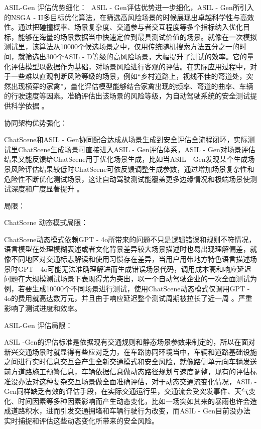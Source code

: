 ASIL-Gen 评估优势细化：
​
ASIL - Gen评估优势进一步细化，ASIL - Gen所引入的NSGA - II多目标优化算法，在筛选高风险场景的时候展现出卓越科学性与高效性。通过把碰撞概率、场景复杂度、交通参与者交互程度等多个指标纳入优化目标，能够在海量的场景数据当中快速定位到最具测试价值的场景。就像在一次模拟测试里，该算法从10000个候选场景之中，仅用传统随机搜索方法五分之一的时间，就筛选出300个ASIL - D等级的高风险场景\cite{段文强0基于用户行为序列的网络购买行为预测}，大幅提升了测试的效率。它的量化评估模型以数据作为基础，对场景风险进行客观的评估。在实际应用过程中，对于一些难以直观判断风险等级的场景，例如“乡村道路上，视线不佳的弯道处，突然出现横穿的家禽”，量化评估模型能够结合家禽出现的频率、弯道的曲率、车辆的行驶速度等因素。准确评估出该场景的风险等级，为自动驾驶系统的安全测试提供科学依据 。​


协同架构优势强化​：

ChatScene和ASIL - Gen协同配合达成从场景生成到安全评估全流程闭环，实际测试里ChatScene生成场景可直接进入ASIL - Gen评估体系，ASIL - Gen对场景评估结果又能反馈给ChatScene用于优化场景生成，比如当ASIL - Gen发现某个生成场景风险评估结果较低时ChatScene可依反馈调整生成参数，通过增加场景复杂性和危险性不断优化测试场景，这让自动驾驶测试能覆盖更多边缘情况和极端场景使测试深度和广度显著提升\cite{chen2016xgboost} 。


局限：

ChatScene 动态模式局限：

ChatScene动态模式依赖GPT - 4o所带来的问题不只是逻辑错误和规则不符情况，语言模型在处理模糊表述或者文化背景差异较大场景描述时也易出现理解偏差，就像不同地区对交通标志解读和使用习惯存在差异，当用户用带地方特色语言描述场景时GPT - 4o可能无法准确理解进而生成错误场景代码，调用成本高和响应延迟问题在大规模测试场景下表现得尤为突出，以一个自动驾驶企业的一次全面测试为例，若要生成10000个不同场景进行测试，使用ChatScene动态模式仅调用GPT - 4o的费用就高达数万元，并且由于响应延迟整个测试周期被拉长了近一周 。严重影响了测试进度和效率。​


ASIL-Gen 评估局限：

ASIL -Gen的评估标准是依据现有交通规则和静态场景参数来制定的，所以在面对新兴交通场景时就显得有些应对乏力，在车路协同环境当中，车辆和道路基础设施之间进行实时信息交互会产生全新交通模式和安全风险，就像路侧单元向车辆发送前方道路施工预警信息，车辆依据信息做动态路径规划与速度调整，现有的评估标准没办法对这种复杂交互场景做全面准确评估，对于动态交通流变化情况，ASIL - Gen同样缺乏有效的评估手段\cite{师圣蔓2019基于机器学习的网络流量预测与应用研究}，在实际交通运行里，交通流会受突发事件、天气变化、时间因素等多种因素影响而产生动态变化，比如一场突如其来的暴雨也许会造成道路积水，进而引发交通拥堵和车辆行驶行为改变，而ASIL - Gen目前没办法实时捕捉和评估这些动态变化所带来的安全风险。

